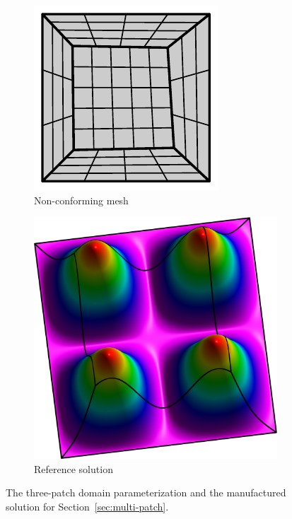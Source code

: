 \documentclass[preprint,12pt]{elsarticle}
\theoremstyle{remark}
\begin{document}
\begin{figure}[hbt]
    \centering
    \begin{subfigure}[b]{0.48\textwidth}
        \includegraphics[width=\textwidth]{five_patch_basic}
        \caption{Non-conforming mesh}
    \end{subfigure}
    \begin{subfigure}[b]{0.48\textwidth}
        \includegraphics[width=\textwidth]{five_patch_solution-plot}
        \caption{Reference solution}
    \end{subfigure}
	\caption{The three-patch domain parameterization and the manufactured solution for Section~\ref{sec:multi-patch}.}\label{fig:five_patch_biharmonic_problem}
\end{figure}
\end{document}
